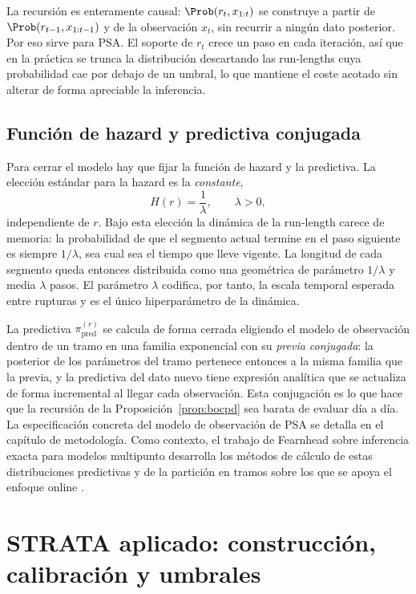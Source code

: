 La recursión es enteramente causal: $\Prob(r_t, x_{1:t})$ se construye a partir de $\Prob(r_{t-1}, x_{1:t-1})$ y de la observación $x_t$, sin recurrir a ningún dato posterior. Por eso sirve para PSA. El soporte de $r_t$ crece un paso en cada iteración, así que en la práctica se trunca la distribución descartando las run-lengths cuya probabilidad cae por debajo de un umbral, lo que mantiene el coste acotado sin alterar de forma apreciable la inferencia.

\subsection{Función de hazard y predictiva conjugada}
\label{sec:bocpd-hazard}

Para cerrar el modelo hay que fijar la función de hazard y la predictiva. La elección estándar para la hazard es la \emph{constante},
\[
H(r) = \frac{1}{\lambda}, \qquad \lambda > 0,
\]
independiente de $r$. Bajo esta elección la dinámica de la run-length carece de memoria: la probabilidad de que el segmento actual termine en el paso siguiente es siempre $1/\lambda$, sea cual sea el tiempo que lleve vigente. La longitud de cada segmento queda entonces distribuida como una geométrica de parámetro $1/\lambda$ y media $\lambda$ pasos. El parámetro $\lambda$ codifica, por tanto, la escala temporal esperada entre rupturas y es el único hiperparámetro de la dinámica.

La predictiva $\pi^{(r)}_{\mathrm{pred}}$ se calcula de forma cerrada eligiendo el modelo de observación dentro de un tramo en una familia exponencial con su \emph{previa conjugada}: la posterior de los parámetros del tramo pertenece entonces a la misma familia que la previa, y la predictiva del dato nuevo tiene expresión analítica que se actualiza de forma incremental al llegar cada observación. Esta conjugación es lo que hace que la recursión de la Proposición~\ref{prop:bocpd} sea barata de evaluar día a día. La especificación concreta del modelo de observación de PSA se detalla en el capítulo de metodología. Como contexto, el trabajo de Fearnhead sobre inferencia exacta para modelos multipunto desarrolla los métodos de cálculo de estas distribuciones predictivas y de la partición en tramos sobre los que se apoya el enfoque online \cite{fearnhead2006}.

\section{STRATA aplicado: construcción, calibración y umbrales}
\label{sec:strata-aplicado}

